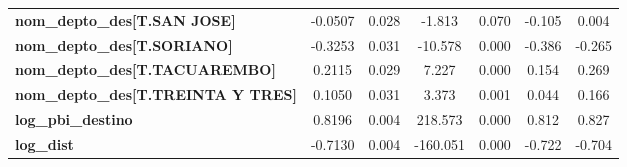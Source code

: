 \begin{center}
\begin{tabular}{lcccccc}
\textbf{nom\_depto\_des[T.SAN JOSE]}       &      -0.0507  &        0.028     &    -1.813  &         0.070        &       -0.105    &        0.004     \\
\textbf{nom\_depto\_des[T.SORIANO]}        &      -0.3253  &        0.031     &   -10.578  &         0.000        &       -0.386    &       -0.265     \\
\textbf{nom\_depto\_des[T.TACUAREMBO]}     &       0.2115  &        0.029     &     7.227  &         0.000        &        0.154    &        0.269     \\
\textbf{nom\_depto\_des[T.TREINTA Y TRES]} &       0.1050  &        0.031     &     3.373  &         0.001        &        0.044    &        0.166     \\
\textbf{log\_pbi\_destino}                 &       0.8196  &        0.004     &   218.573  &         0.000        &        0.812    &        0.827     \\
\textbf{log\_dist}                         &      -0.7130  &        0.004     &  -160.051  &         0.000        &       -0.722    &       -0.704     \\
\bottomrule
\end{tabular}
\end{center}
